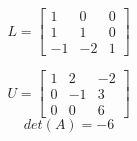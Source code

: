 

\[
L=\left[
\begin{array}{ccc}
1 & 0 & 0 \\
1 & 1 & 0\\
-1 & -2 & 1
\end{array}
\right]
\]

\[
U=\left[
\begin{array}{ccc}
 1& 2 & -2 \\
 0 & -1 & 3 \\
 0 & 0 & 6
\end{array}
\right]
\]
$$det(A)=-6$$
